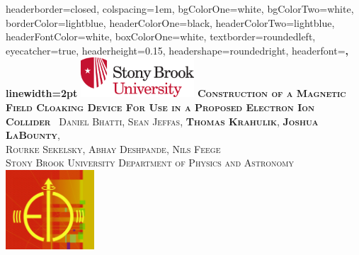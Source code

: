 \documentclass[landscape,a0paper,fontscale=0.290]{baposter} %
\begin{document}
\begin{poster}
{
headerborder=closed, %
colspacing=1em, %
bgColorOne=white, %
bgColorTwo=white, %
borderColor=lightblue, %
headerColorOne=black, %
headerColorTwo=lightblue, %
headerFontColor=white, %
boxColorOne=white, %
textborder=roundedleft, %
eyecatcher=true, %
headerheight=0.15\textheight, %
headershape=roundedright, %
headerfont=\Large\bf\textsc, %
linewidth=2pt %
}
%
{\includegraphics[height=4em]{SB_Logo.png}} %
{\bf\textsc{Construction of a Magnetic Field Cloaking Device For Use in a Proposed Electron Ion Collider}\vspace{0.5em}} %
{\textsc{\ Daniel Bhatti, Sean Jeffas, \textbf{Thomas Krahulik}, \textbf{Joshua LaBounty}, \\ Rourke Sekelsky, Abhay Deshpande, Nils Feege \\ Stony Brook University Department of Physics and Astronomy}}%
{\hspace{10mm} \includegraphics[height=8em]{CreatedEICLogo.png}} %


\end{poster}
\end{document}
